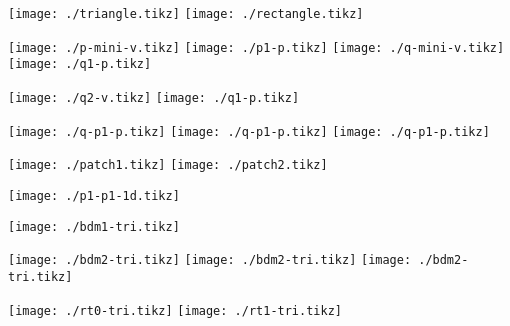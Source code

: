 \documentclass{article}
\begin{document}
\texttt{[image: ./triangle.tikz]}
\texttt{[image: ./rectangle.tikz]}

\texttt{[image: ./p-mini-v.tikz]}
\texttt{[image: ./p1-p.tikz]}
\texttt{[image: ./q-mini-v.tikz]}
\texttt{[image: ./q1-p.tikz]}

\texttt{[image: ./q2-v.tikz]}
\texttt{[image: ./q1-p.tikz]}

\texttt{[image: ./q-p1-p.tikz]}
\texttt{[image: ./q-p1-p.tikz]}
\texttt{[image: ./q-p1-p.tikz]}


\texttt{[image: ./patch1.tikz]}
\texttt{[image: ./patch2.tikz]}

\texttt{[image: ./p1-p1-1d.tikz]}

\texttt{[image: ./bdm1-tri.tikz]}

\texttt{[image: ./bdm2-tri.tikz]}
\texttt{[image: ./bdm2-tri.tikz]}
\texttt{[image: ./bdm2-tri.tikz]}

\texttt{[image: ./rt0-tri.tikz]}
\texttt{[image: ./rt1-tri.tikz]}
\end{document}
